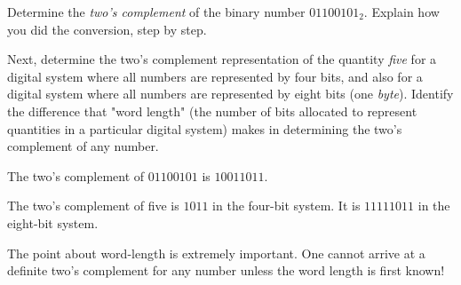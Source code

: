

Determine the {\it two's complement} of the binary number $01100101_2$.  Explain how you did the conversion, step by step.

Next, determine the two's complement representation of the quantity {\it five} for a digital system where all numbers are represented by four bits, and also for a digital system where all numbers are represented by eight bits (one {\it byte}).  Identify the difference that "word length" (the number of bits allocated to represent quantities in a particular digital system) makes in determining the two's complement of any number.







The two's complement of $01100101$ is $10011011$.

\vskip 10pt

The two's complement of five is $1011$ in the four-bit system.  It is $11111011$ in the eight-bit system. 







The point about word-length is extremely important.  One cannot arrive at a definite two's complement for any number unless the word length is first known!





